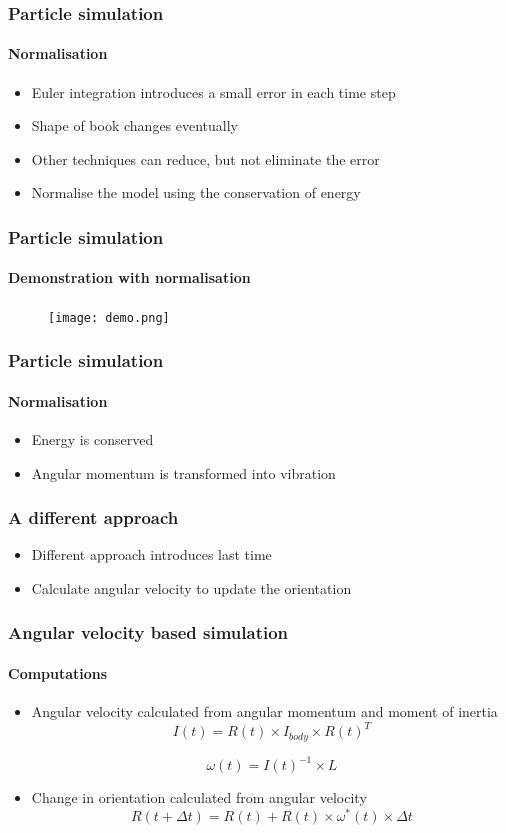 \documentclass{beamer}
\begin{document}
\begin{frame}
 \frametitle{Particle simulation}
 \framesubtitle{Normalisation}
 \begin{itemize}
  \item Euler integration introduces a small error in each time step
  \item Shape of book changes eventually
  \item Other techniques can reduce, but not eliminate the error
  \item Normalise the model using the conservation of energy
 \end{itemize}
\end{frame}

\begin{frame}
 \frametitle{Particle simulation}
 \framesubtitle{Demonstration with normalisation}
 \begin{figure}
  \centering
  \texttt{[image: demo.png]}
 \end{figure}
\end{frame}

\begin{frame}
 \frametitle{Particle simulation}
 \framesubtitle{Normalisation}
 \begin{itemize}
  \item Energy is conserved
  \item Angular momentum is transformed into vibration
 \end{itemize}
\end{frame}

\begin{frame}
 \frametitle{A different approach}
 \begin{itemize}
  \item Different approach introduces last time
  \item Calculate angular velocity to update the orientation
 \end{itemize}
\end{frame}

\begin{frame}
 \frametitle{Angular velocity based simulation}
 \framesubtitle{Computations}
 \begin{itemize}
  \item Angular velocity calculated from angular momentum and moment of inertia
  \begin{displaymath}
  I(t) = R(t) \times I_{body} \times R(t)^{T}
  \end{displaymath}

  \begin{displaymath}
  \omega(t) = I(t)^{-1} \times L
  \end{displaymath}
  \item Change in orientation calculated from angular velocity
  \begin{displaymath}
  R(t + \Delta t) = R(t) + R(t) \times \omega^*(t) \times \Delta t
  \end{displaymath}
 \end{itemize}
\end{frame}
\end{document}
